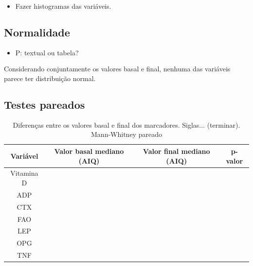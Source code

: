\documentclass[a4paper]{article}
\begin{document}
\begin{itemize}
\item Fazer histogramas das variáveis.
\end{itemize}

\newpage
\subsection{Normalidade}

\begin{itemize}
\item P: textual ou tabela?
\end{itemize}

Considerando conjuntamente os valores basal e final, nenhuma das variáveis parece ter distribuição normal.

\newpage
\subsection{Testes pareados}
\label{sec:pareados}

\begin{table}[!h]
  \centering
  \begin{tabular}{c|cc|c}
    \hline
    Variável&Valor basal mediano (AIQ) &Valor final mediano (AIQ) &p-valor\\
    \hline
    \hline
    Vitamina D&&&\\
\hline
    ADP&&&\\
    CTX&&&\\
    FAO&&&\\
    LEP&&&\\
    OPG&&&\\
    TNF&&&\\
    \hline
  \end{tabular}
  \caption[Diferenças entre os valores basal e final dos marcadores]{Diferenças entre os valores basal e final dos marcadores. Siglas... (terminar). Mann-Whitney pareado}
  \label{tab:testes-pareados}
\end{table}
\end{document}
